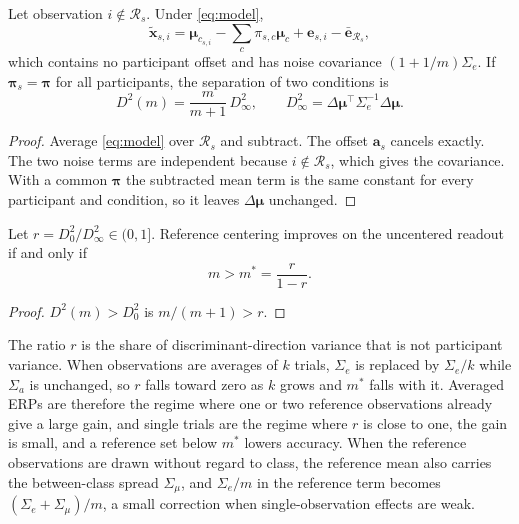 \begin{proposition}\label{prop:law}
Let observation $i\notin\mathcal{R}_s$. Under \eqref{eq:model},
\begin{equation}
\tilde{\mathbf{x}}_{s,i}=\boldsymbol\mu_{c_{s,i}}-\textstyle\sum_c\pi_{s,c}\boldsymbol\mu_c+\mathbf{e}_{s,i}-\bar{\mathbf{e}}_{\mathcal{R}_s}, \label{eq:centered}
\end{equation}
which contains no participant offset and has noise covariance $(1+1/m)\Sigma_e$. If $\boldsymbol\pi_s=\boldsymbol\pi$ for all participants, the separation of two conditions is
\begin{equation}
D^2(m)=\frac{m}{m+1}\,D_\infty^2,\qquad D_\infty^2=\Delta\boldsymbol\mu^\top\Sigma_e^{-1}\Delta\boldsymbol\mu. \label{eq:law}
\end{equation}
\end{proposition}
\begin{proof}
Average \eqref{eq:model} over $\mathcal{R}_s$ and subtract. The offset $\mathbf{a}_s$ cancels exactly. The two noise terms are independent because $i\notin\mathcal{R}_s$, which gives the covariance. With a common $\boldsymbol\pi$ the subtracted mean term is the same constant for every participant and condition, so it leaves $\Delta\boldsymbol\mu$ unchanged.
\end{proof}

\begin{corollary}\label{cor:breakeven}
Let $r=D_0^2/D_\infty^2\in(0,1]$. Reference centering improves on the uncentered readout if and only if
\begin{equation}
m>m^\ast=\frac{r}{1-r}. \label{eq:breakeven}
\end{equation}
\end{corollary}
\begin{proof}
$D^2(m)>D_0^2$ is $m/(m+1)>r$.
\end{proof}

The ratio $r$ is the share of discriminant-direction variance that is not participant variance. When observations are averages of $k$ trials, $\Sigma_e$ is replaced by $\Sigma_e/k$ while $\Sigma_a$ is unchanged, so $r$ falls toward zero as $k$ grows and $m^\ast$ falls with it. Averaged ERPs are therefore the regime where one or two reference observations already give a large gain, and single trials are the regime where $r$ is close to one, the gain is small, and a reference set below $m^\ast$ lowers accuracy. When the reference observations are drawn without regard to class, the reference mean also carries the between-class spread $\Sigma_\mu$, and $\Sigma_e/m$ in the reference term becomes $(\Sigma_e+\Sigma_\mu)/m$, a small correction when single-observation effects are weak.


